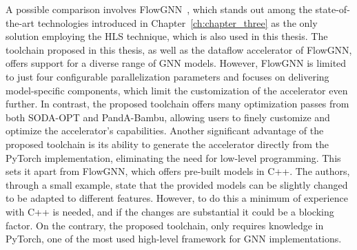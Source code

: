 A possible comparison involves FlowGNN~\cite{sarkar2022flowgnn}, which stands out among the state-of-the-art technologies introduced in Chapter~\ref{ch:chapter_three} as the only solution employing the HLS technique, which is also used in this thesis.
The toolchain proposed in this thesis, as well as the dataflow accelerator of FlowGNN, offers support for a diverse range of GNN models.
However, FlowGNN is limited to just four configurable parallelization parameters and focuses on delivering model-specific components, which limit the customization of the accelerator even further.
In contrast, the proposed toolchain offers many optimization passes from both SODA-OPT and PandA-Bambu, allowing users to finely customize and optimize the accelerator's capabilities.
Another significant advantage of the proposed toolchain is its ability to generate the accelerator directly from the PyTorch implementation, eliminating the need for low-level programming.
This sets it apart from FlowGNN, which offers pre-built models in C++.
The authors, through a small example, state that the provided models can be slightly changed to be adapted to different features.
However, to do this a minimum of experience with C++ is needed, and if the changes are substantial it could be a blocking factor.
On the contrary, the proposed toolchain, only requires knowledge in PyTorch, one of the most used high-level framework for GNN implementations.

